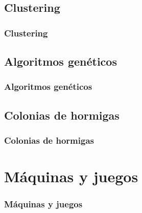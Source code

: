 \documentclass[9pt]{beamer} %
\begin{document}
	\subsection{Clustering}
		\begin{frame}
		\frametitle{Clustering}
		\end{frame}

	\subsection{Algoritmos genéticos}
		\begin{frame}
		\frametitle{Algoritmos genéticos}
		\end{frame}

	\subsection{Colonias de hormigas}
		\begin{frame}
		\frametitle{Colonias de hormigas}
		\end{frame}

\section{Máquinas y juegos}
	\begin{frame}
	\frametitle{Máquinas y juegos}
	\end{frame}
\end{document}
